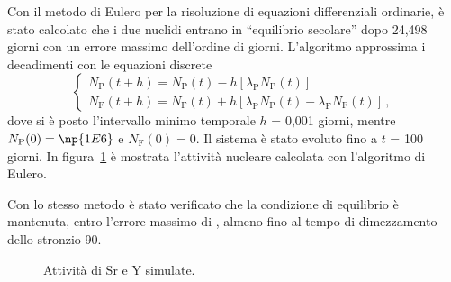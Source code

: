 Con il metodo di Eulero per la risoluzione di equazioni differenziali ordinarie, è stato %
calcolato che i due nuclidi entrano in ``equilibrio secolare'' dopo 24,498 giorni con %
un errore massimo dell'ordine di  giorni.
L'algoritmo approssima i decadimenti con le equazioni discrete
\begin{equation}
  \begin{cases}
  N_{\mathrm{P}}(t+h)=N_{\mathrm{P}}(t)-h[\lambda_{\mathrm{P}}N_{\mathrm{P}}(t)] \\
  N_{\mathrm{F}}(t+h)=N_{\mathrm{F}}(t)+h[\lambda_{\mathrm{P}}N_{\mathrm{P}}(t) %
  -\lambda_{\mathrm{F}} N_{\mathrm{F}}(t)]\,,
  \end{cases}
\end{equation}
dove si è posto l'intervallo minimo temporale $h$ = 0,001 giorni, mentre %
$N_{\mathrm{P}}(0) = \np{1E6}$ e $N_{\mathrm{F}}(0) = 0$.
Il sistema è stato evoluto fino a $t$ = 100 giorni.
In figura~\ref{fig:seculum} è mostrata l'attività nucleare calcolata con l'algoritmo di %
Eulero.

Con lo stesso metodo è stato verificato che la condizione di equilibrio è mantenuta, entro %
l'errore massimo di , almeno fino al tempo di dimezzamento dello \mbox{stronzio-90}.

\begin{figure}
  \centering
    
    \caption{Attività di Sr e Y simulate.}
  \label{fig:seculum}
\end{figure}
